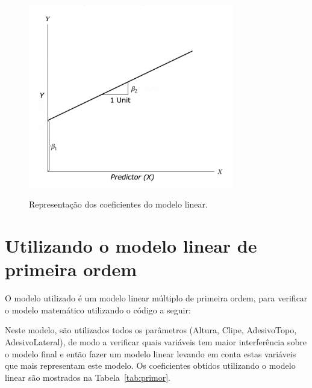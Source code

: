 \begin{figure}[H]
    \centering
    \caption{Representação dos coeficientes do modelo linear.}
    \includegraphics[width=0.8\textwidth]{images/linear-regression.png}
    \label{fig:reg-lin}
  \end{figure}

\section{Utilizando o modelo linear de primeira ordem}
\label{sec:a_modelagem_matematica_utilizando_o_modelo_linear}

O modelo utilizado é um modelo linear múltiplo de primeira ordem, para verificar o modelo matemático utilizando o código a seguir:




Neste modelo, são utilizados todos os parâmetros (Altura, Clipe, AdesivoTopo, AdesivoLateral), de modo a verificar quais variáveis tem maior interferência sobre o modelo final e então fazer um modelo linear levando em conta estas variáveis que mais representam este modelo. Os coeficientes obtidos utilizando o modelo linear são mostrados na Tabela~\ref{tab:primor}.


